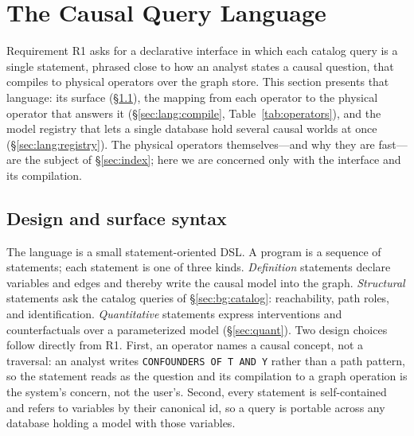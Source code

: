 \section{The Causal Query Language}\label{sec:lang}

Requirement R1 asks for a declarative interface in which each catalog query is a
single statement, phrased close to how an analyst states a causal question, that
compiles to physical operators over the graph store. This section presents that
language: its surface (\S\ref{sec:lang:surface}), the mapping from each operator
to the physical operator that answers it (\S\ref{sec:lang:compile},
Table~\ref{tab:operators}), and the model registry that lets a single database
hold several causal worlds at once (\S\ref{sec:lang:registry}). The physical
operators themselves---and why they are fast---are the subject of
\S\ref{sec:index}; here we are concerned only with the interface and its
compilation.

\subsection{Design and surface syntax}\label{sec:lang:surface}

The language is a small statement-oriented DSL. A program is a sequence of
statements; each statement is one of three kinds. \emph{Definition} statements
declare variables and edges and thereby write the causal model into the graph.
\emph{Structural} statements ask the catalog queries of \S\ref{sec:bg:catalog}:
reachability, path roles, and identification. \emph{Quantitative} statements
express interventions and counterfactuals over a parameterized model
(\S\ref{sec:quant}). Two design choices follow directly from R1. First, an
operator names a causal concept, not a traversal: an analyst writes
\lstinline[style=causaldsl]|CONFOUNDERS OF T AND Y| rather than a path pattern,
so the statement reads as the question and its compilation to a graph operation
is the system's concern, not the user's. Second, every statement is
self-contained and refers to variables by their canonical
\textsf{id}, so a query is portable across any database holding a model with
those variables.

